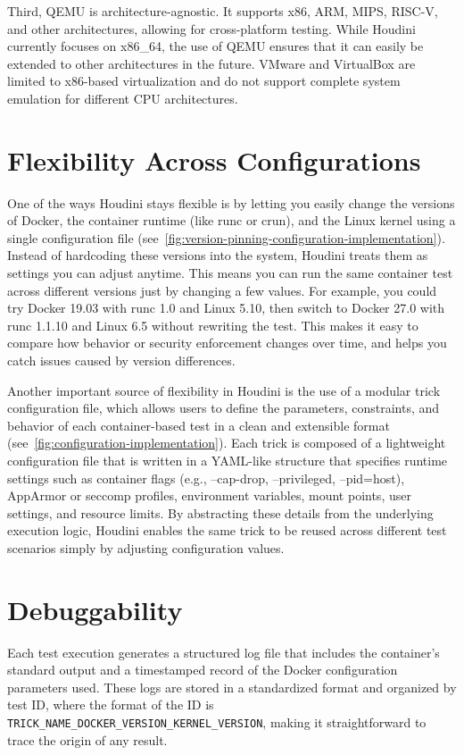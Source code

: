 \documentclass[12pt]{report}
\begin{document}
\begin{doublespace}
Third, QEMU is architecture-agnostic. It supports x86, ARM, MIPS, RISC-V, and other architectures, allowing for cross-platform testing. While Houdini currently focuses on x86\_64, the use of QEMU ensures that it can easily be extended to other architectures in the future. VMware and VirtualBox are limited to x86-based virtualization and do not support complete system emulation for different CPU architectures.

\section{Flexibility Across Configurations}

One of the ways Houdini stays flexible is by letting you easily change the versions of Docker, the container runtime (like runc or crun), and the Linux kernel using a single configuration file (see~\ref{fig:version-pinning-configuration-implementation}). Instead of hardcoding these versions into the system, Houdini treats them as settings you can adjust anytime. This means you can run the same container test across different versions just by changing a few values. For example, you could try Docker 19.03 with runc 1.0 and Linux 5.10, then switch to Docker 27.0 with runc 1.1.10 and Linux 6.5 without rewriting the test. This makes it easy to compare how behavior or security enforcement changes over time, and helps you catch issues caused by version differences.

Another important source of flexibility in Houdini is the use of a modular trick configuration file, which allows users to define the parameters, constraints, and behavior of each container-based test in a clean and extensible format (see~\ref{fig:configuration-implementation}). Each trick is composed of a lightweight configuration file that is written in a YAML-like structure that specifies runtime settings such as container flags (e.g., --cap-drop, --privileged, --pid=host), AppArmor or seccomp profiles, environment variables, mount points, user settings, and resource limits. By abstracting these details from the underlying execution logic, Houdini enables the same trick to be reused across different test scenarios simply by adjusting configuration values.

\section{Debuggability}

Each test execution generates a structured log file that includes the container's standard output and a timestamped record of the Docker configuration parameters used. These logs are stored in a standardized format and organized by test ID, where the format of the ID is \texttt{TRICK_NAME_DOCKER_VERSION_KERNEL_VERSION}, making it straightforward to trace the origin of any result.


\end{doublespace}
\end{document}
